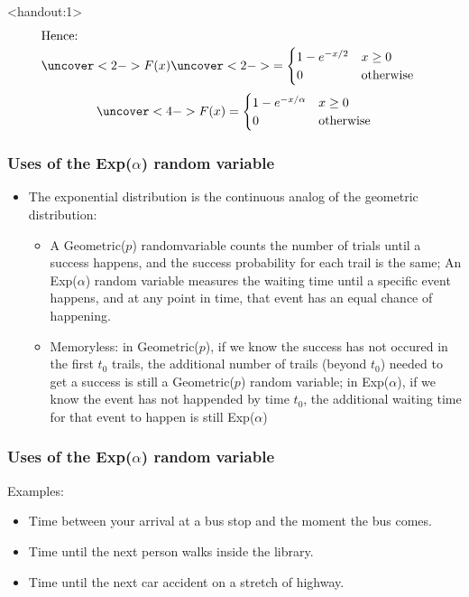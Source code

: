 \documentclass[handout]{beamer}\usepackage[]{graphicx}\usepackage[]{color}
\newcommand{\answers}{1}
\numberwithin{equation}{section}
\begin{document}
\begin{frame}<handout:\answers>
\begin{align*}
\intertext{Hence:}
\uncover<2->{F(x)} & \uncover<2->{= \begin{cases}
1 - e^{-x/2} & x \ge 0 \\
0 & \text{otherwise}
\end{cases}}
\end{align*}
\begin{align*}
\uncover<4->{F(x) = \begin{cases}
1 - e^{-x/\alpha} & x \ge 0 \\
0 & \text{otherwise}
\end{cases}}
\end{align*}
\end{frame}




\begin{frame}
\frametitle{Uses of the Exp($\alpha$) random variable}
\begin{itemize}
\item The exponential distribution is the continuous analog of the geometric distribution:
\begin{itemize}
\item
A Geometric($p$) randomvariable counts the number of trials until a success happens, and the success probability for each trail is the same; An Exp($\alpha$) random variable measures the waiting time until a specific event happens, and at any point in time, that event has an equal chance of happening.
\item Memoryless: in Geometric($p$), if we know the success has not occured in the first $t_0$ trails, the additional number of trails (beyond $t_0$) needed to get a success is still a Geometric($p$) random variable; in Exp($\alpha$), if we know the event has not happended by time $t_0$, the additional waiting time for that event to happen is still Exp($\alpha$)

\end{itemize}
\end{itemize}
\end{frame}

\begin{frame}
\frametitle{Uses of the Exp($\alpha$) random variable}
Examples:
\begin{itemize}
\pause \item Time between your arrival at a bus stop and the moment the bus comes.
\pause \item Time until the next person walks inside the library.
\pause \item Time until the next car accident on a stretch of highway.
\end{itemize}

\end{frame}
\end{document}
